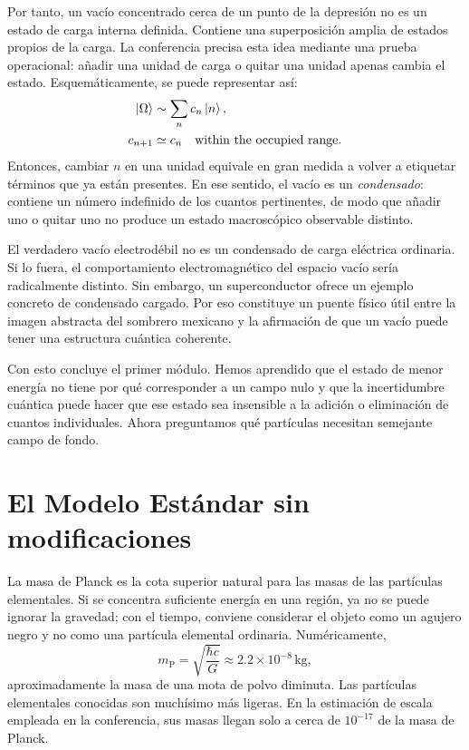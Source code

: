 Por tanto, un vacío concentrado cerca de un punto de la depresión no es un estado de carga interna definida. Contiene una superposición amplia de estados propios de la carga. La conferencia precisa esta idea mediante una prueba operacional: añadir una unidad de carga o quitar una unidad apenas cambia el estado. Esquemáticamente, se puede representar así:
\begin{align}
\left\lvert\Omega\right\rangle
&\sim
\sum_n c_n\left\lvert n\right\rangle,
\\
c_{n+1}
&\simeq
c_n
\quad\text{within the occupied range}.
\end{align}
Entonces, cambiar $n$ en una unidad equivale en gran medida a volver a etiquetar términos que ya están presentes. En ese sentido, el vacío es un \emph{condensado}: contiene un número indefinido de los cuantos pertinentes, de modo que añadir uno o quitar uno no produce un estado macroscópico observable distinto.

El verdadero vacío electrodébil no es un condensado de carga eléctrica ordinaria. Si lo fuera, el comportamiento electromagnético del espacio vacío sería radicalmente distinto. Sin embargo, un superconductor ofrece un ejemplo concreto de condensado cargado. Por eso constituye un puente físico útil entre la imagen abstracta del sombrero mexicano y la afirmación de que un vacío puede tener una estructura cuántica coherente.

Con esto concluye el primer módulo. Hemos aprendido que el estado de menor energía no tiene por qué corresponder a un campo nulo y que la incertidumbre cuántica puede hacer que ese estado sea insensible a la adición o eliminación de cuantos individuales. Ahora preguntamos qué partículas necesitan semejante campo de fondo.

\section{El Modelo Estándar sin modificaciones}

La masa de Planck es la cota superior natural para las masas de las partículas elementales. Si se concentra suficiente energía en una región, ya no se puede ignorar la gravedad; con el tiempo, conviene considerar el objeto como un agujero negro y no como una partícula elemental ordinaria. Numéricamente,
\begin{equation}
m_{\mathrm P}
=
\sqrt{\frac{\hbar c}{G}}
\approx
2.2\times10^{-8}\,\mathrm{kg},
\end{equation}
aproximadamente la masa de una mota de polvo diminuta. Las partículas elementales conocidas son muchísimo más ligeras. En la estimación de escala empleada en la conferencia, sus masas llegan solo a cerca de $10^{-17}$ de la masa de Planck.

